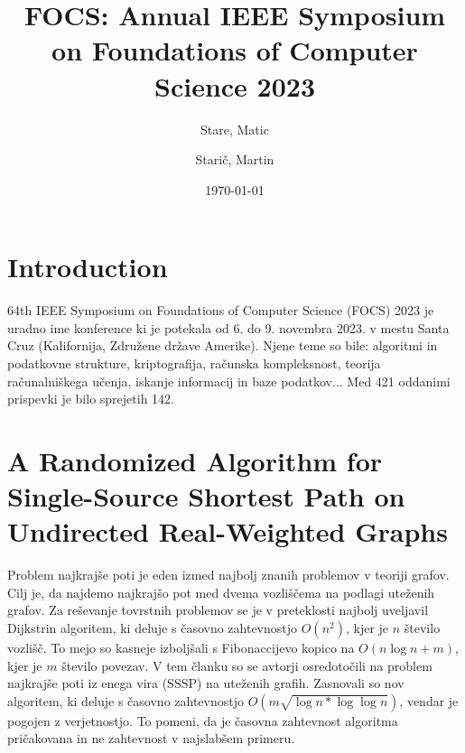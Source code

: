 \documentclass{article}
\title{FOCS: Annual IEEE Symposium on Foundations of Computer Science 2023}
\author{
  Stare, Matic\\
  \and
  Starič, Martin\\
}
\date{\today}
\begin{document}
\maketitle

\tableofcontents
\newpage




\section{Introduction}
64th IEEE Symposium on Foundations of Computer Science (FOCS) 2023 je uradno ime konference ki je potekala od 6. do 9. novembra 2023. v mestu Santa Cruz (Kalifornija, Združene države Amerike). Njene teme so bile: algoritmi in podatkovne strukture, kriptografija, računska kompleksnost, teorija računalniškega učenja, iskanje informacij in baze podatkov... Med 421 oddanimi prispevki je bilo sprejetih 142.

\section{A Randomized Algorithm for Single-Source Shortest Path on Undirected Real-Weighted Graphs}

Problem najkrajše poti je eden izmed najbolj znanih problemov v teoriji grafov. Cilj je, da najdemo najkrajšo pot med dvema vozliščema na podlagi uteženih grafov. Za reševanje tovrstnih problemov se je v preteklosti najbolj uveljavil Dijkstrin algoritem, ki deluje s časovno zahtevnostjo $O(n^2)$, kjer je $n$ število vozlišč. To mejo so kasneje izboljšali s Fibonaccijevo kopico na $O(n \log n + m)$, kjer je $m$ število povezav. V tem članku so se avtorji osredotočili na problem najkrajše poti iz enega vira (SSSP) na uteženih grafih. Zasnovali so nov algoritem, ki deluje s časovno zahtevnostjo $O(m \sqrt{\log n * \log \log n})$, vendar je pogojen z verjetnostjo. To pomeni, da je časovna zahtevnost algoritma pričakovana in ne zahtevnost v najslabšem primeru. 
\end{document}
